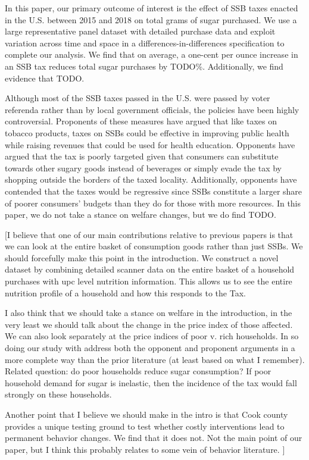 \documentclass[12pt]{article}
\begin{document}
In this paper, our primary outcome of interest is the effect of SSB taxes enacted in the U.S. between 2015 and 2018 on total grams of sugar purchased. We use a large representative panel dataset with detailed purchase data and exploit variation across time and space in a differences-in-differences specification to complete our analysis. We find that on average, a one-cent per ounce increase in an SSB tax reduces total sugar purchases by TODO\%. Additionally, we find evidence that TODO.

Although most of the SSB taxes passed in the U.S. were passed by voter referenda rather than by local government officials, the policies have been highly controversial. Proponents of these measures have argued that like taxes on tobacco products, taxes on SSBs could be effective in improving public health while raising revenues that could be used for health education. Opponents have argued that the tax is poorly targeted given that consumers can substitute towards other sugary goods instead of beverages or simply evade the tax by shopping outside the borders of the taxed locality. Additionally, opponents have contended that the taxes would be regressive since SSBs constitute a larger share of poorer consumers' budgets than they do for those with more resources. In this paper, we do not take a stance on welfare changes, but we do find TODO.

[I believe that one of our main contributions relative to previous papers is that we can look at the entire basket of consumption goods rather than just SSBs. We should forcefully make this point in the introduction. We construct a novel dataset by combining detailed scanner data on the entire basket of a household purchases with upc level nutrition information. This allows us to see the entire nutrition profile of a household and how this responds to the Tax.

I also think that we should take a stance on welfare in the introduction, in the very least we should talk about the change in the price index of those affected. We can also look separately at the price indices of poor v. rich households. In so doing our study with address both the opponent and proponent arguments in a more complete way than the prior literature (at least based on what I remember). Related question: do poor households reduce sugar consumption? If poor household demand for sugar is inelastic, then the incidence of the tax would fall strongly on these households.

Another point that I believe we should make in the intro is that Cook county provides a unique testing ground to test whether costly interventions lead to permanent behavior changes. We find that it does not. Not the main point of our paper, but I think this probably relates to some vein of behavior literature. ]
\end{document}
